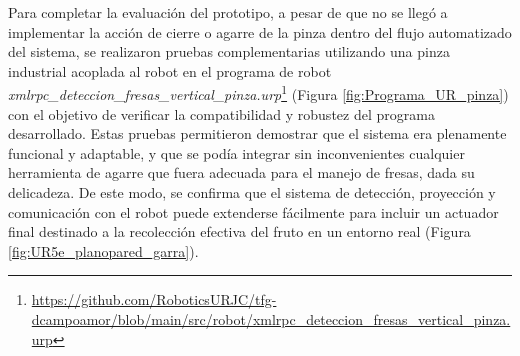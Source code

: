 Para completar la evaluación del prototipo, a pesar de que no se llegó a implementar la acción de cierre o agarre de la pinza dentro del flujo automatizado del sistema, se realizaron pruebas complementarias utilizando una pinza industrial acoplada al robot en el programa de robot \textit{xmlrpc\_deteccion\_fresas\_vertical\_pinza.urp}\footnote{\url{https://github.com/RoboticsURJC/tfg-dcampoamor/blob/main/src/robot/xmlrpc_deteccion_fresas_vertical_pinza.urp}} (Figura \ref{fig:Programa_UR_pinza}) con el objetivo de verificar la compatibilidad y robustez del programa desarrollado. Estas pruebas permitieron demostrar que el sistema era plenamente funcional y adaptable, y que se podía integrar sin inconvenientes cualquier herramienta de agarre que fuera adecuada para el manejo de fresas, dada su delicadeza. De este modo, se confirma que el sistema de detección, proyección y comunicación con el robot puede extenderse fácilmente para incluir un actuador final destinado a la recolección efectiva del fruto en un entorno real (Figura \ref{fig:UR5e_planopared_garra}).

